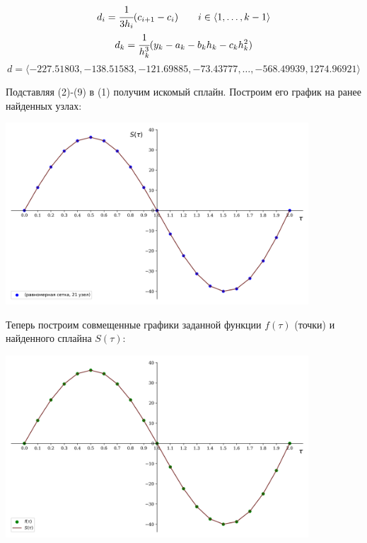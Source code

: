 \documentclass[a4paper, 14pt]{extarticle}
\begin{document}

\begin{gather}
    d_i = \cfrac{1}{3 h_i} (c_{i+1} - c_i) \qquad i \in \langle 1, \dots, k-1 \rangle \\
    d_k = \cfrac{1}{h_k^3} (y_k - a_k - b_k h_k - c_k h_k^2) 
\end{gather}
\begin{equation*}
    d = \langle -227.51803, -138.51583, -121.69885, -73.43777, \dots, -568.49939, 1274.96921 \rangle 
\end{equation*}

Подставляя (2)-(9) в (1) получим искомый сплайн. Построим его график на ранее 
найденных узлах:

\begin{center}
    \includegraphics[width=0.85\textwidth]{spline_20}
\end{center}


Теперь построим совмещенные графики заданной функции $f(\tau)$ (точки) и 
найденного сплайна $S(\tau)$:

\begin{center}
    \includegraphics[width=0.85\textwidth]{main_x_spline_20.png}
\end{center}
\end{document}
